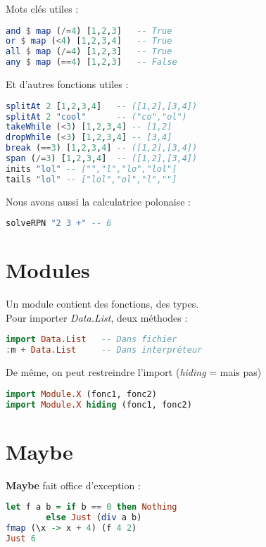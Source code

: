             Mots clés utiles :
            \begin{lstlisting}[language=Haskell]
and $ map (/=4) [1,2,3]   -- True
or $ map (<4) [1,2,3,4]   -- True
all $ map (/=4) [1,2,3]   -- True
any $ map (==4) [1,2,3]   -- False
            \end{lstlisting}
            Et d'autres fonctions utiles :
            \begin{lstlisting}[language=Haskell]
splitAt 2 [1,2,3,4]   -- ([1,2],[3,4])
splitAt 2 "cool"      -- ("co","ol")
takeWhile (<3) [1,2,3,4] -- [1,2]
dropWhile (<3) [1,2,3,4] -- [3,4]
break (==3) [1,2,3,4] -- ([1,2],[3,4])
span (/=3) [1,2,3,4]  -- ([1,2],[3,4])
inits "lol" -- ["","l","lo","lol"]
tails "lol" -- ["lol","ol","l",""]
            \end{lstlisting}
            Nous avons aussi la calculatrice polonaise :
            \begin{lstlisting}[language=Haskell]
solveRPN "2 3 +" -- 6
            \end{lstlisting}

    \section{Modules}
        Un module contient des fonctions, des types.\\
        Pour importer \textit{Data.List}, deux méthodes :
        \begin{lstlisting}[language=Haskell]
import Data.List   -- Dans fichier
:m + Data.List     -- Dans interpréteur
        \end{lstlisting}
        De même, on peut restreindre l'import (\textit{hiding} = mais pas)
        \begin{lstlisting}[language=Haskell]
import Module.X (fonc1, fonc2)
import Module.X hiding (fonc1, fonc2)
        \end{lstlisting}
    \section{Maybe}
        \textbf{Maybe} fait office d'exception :
        \begin{lstlisting}[language=Haskell]
let f a b = if b == 0 then Nothing
		else Just (div a b)
fmap (\x -> x + 4) (f 4 2)
Just 6
        \end{lstlisting}
